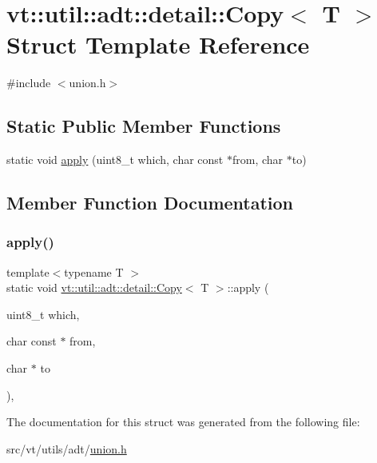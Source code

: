 \hypertarget{structvt_1_1util_1_1adt_1_1detail_1_1_copy_3_01_t_01_4}{}\section{vt\+:\+:util\+:\+:adt\+:\+:detail\+:\+:Copy$<$ T $>$ Struct Template Reference}
\label{structvt_1_1util_1_1adt_1_1detail_1_1_copy_3_01_t_01_4}


{\ttfamily \#include $<$union.\+h$>$}

\subsection*{Static Public Member Functions}
\begin{DoxyCompactItemize}
\item 
static void \hyperlink{structvt_1_1util_1_1adt_1_1detail_1_1_copy_3_01_t_01_4_a318781016f576885d482cf703fc40709}{apply} (uint8\+\_\+t which, char const $\ast$from, char $\ast$to)
\end{DoxyCompactItemize}


\subsection{Member Function Documentation}
\mbox{\label{structvt_1_1util_1_1adt_1_1detail_1_1_copy_3_01_t_01_4_a318781016f576885d482cf703fc40709}} 
\subsubsection{\texorpdfstring{apply()}{apply()}}
{\footnotesize\ttfamily template$<$typename T $>$ \\
static void \hyperlink{structvt_1_1util_1_1adt_1_1detail_1_1_copy}{vt\+::util\+::adt\+::detail\+::\+Copy}$<$ T $>$\+::apply (\begin{DoxyParamCaption}\item[{uint8\+\_\+t}]{which,  }\item[{char const $\ast$}]{from,  }\item[{char $\ast$}]{to }\end{DoxyParamCaption})\hspace{0.3cm}{\ttfamily [inline]}, {\ttfamily [static]}}



The documentation for this struct was generated from the following file\+:\begin{DoxyCompactItemize}
\item 
src/vt/utils/adt/\hyperlink{union_8h}{union.\+h}\end{DoxyCompactItemize}
